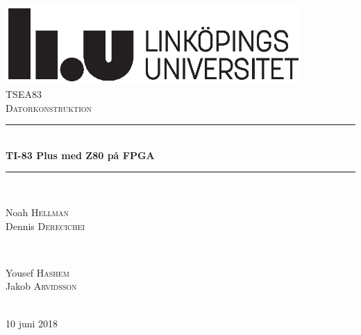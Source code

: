 \documentclass[main.tex]{subfiles}
\begin{document}
\thispagestyle{empty}
\begin{center}
    \includegraphics[height=3cm]{img/liu.eps}\\[2cm]

    \textsc{\Large TSEA83}\\[1cm]
    \textsc{\large Datorkonstruktion}\\[2cm]
    
    \rule{\linewidth}{0.5mm} \\[0.8cm]
    { \huge \bfseries TI-83 Plus med Z80 på FPGA}\\[0.6cm]
    \rule{\linewidth}{0.5mm} \\[3cm]
     
    \begin{minipage}{0.4\textwidth}
        \begin{flushleft} \large
        Noah \textsc{Hellman}\\
        Dennis \textsc{Derecichei}
        \end{flushleft}
    \end{minipage}
    ~
    \begin{minipage}{0.4\textwidth}
        \begin{flushright} \large
        Yousef \textsc{Hashem}\\
        Jakob \textsc{Arvidsson}
        \end{flushright}
    \end{minipage}\\[4.2cm]
    
    {\large 10 juni 2018}\\[4cm] %
\end{center}
\vfill
\end{document}
